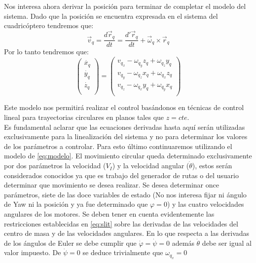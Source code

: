 \documentclass[main]{subfiles}
\begin{document}
Nos interesa ahora derivar la posici\'on para terminar de completar el modelo del sistema. Dado que la posici\'on se encuentra expresada en el sistema del cuadric\'optero tendremos que:
\begin{equation}
\vec{v}_q = \frac{d\vec{r}_q}{dt}=\frac{d\prime\vec{r}_q}{dt}+\vec{\omega}_q \times \vec{r}_q
\end{equation}
Por lo tanto tendremos que:
\begin{equation}
\label{eq:MVEcirc}
\left(\begin{array}{c}
\dot{x_q}\\
\dot{y_q}\\
\dot{z_q}\\
\end{array}\right)=\left(\begin{array}{c}
v_{q_x}-\omega_{q_y}z_q+\omega_{q_z}y_q\\
v_{q_y}-\omega_{q_z}x_q+\omega_{q_x}z_q\\
v_{q_z}-\omega_{q_x}y_q+\omega_{q_y}x_q\\
\end{array}\right)
\end{equation}

Este modelo nos permitir\'a realizar el control bas\'andonos en t\'ecnicas de control lineal para trayectorias circulares en planos tales que $z=cte$.\\

Es fundamental aclarar que las ecuaciones derivadas hasta aqu\'i ser\'an utilizadas exclusivamente para la linealizaci\'on del sistema y no para determinar los valores de los par\'ametros a controlar. Para esto \'ultimo continuaremos utilizando el modelo de \ref{eq:modelo}. El movimiento circular queda determinado exclusivamente por dos par\'ametros la velocidad ($V_I$) y la velocidad angular ($\dot{\theta}$), estos ser\'an considerados conocidos ya que es trabajo del generador de rutas o del usuario determinar que movimiento se desea realizar. Se desea determinar once par\'ametros, siete de las doce variables de estado (No nos interesa fijar ni \'angulo de Yaw ni la posici\'on y ya fue determinado que $\varphi = 0$) y las cuatro velocidades angulares de los motores.  Se deben tener en cuenta evidentemente las restricciones establecidas en \ref{eq:slit} sobre las derivadas de las velocidades del centro de masa y de las velocidades angulares. En lo que respecta a las derivadas de los \'angulos de Euler se debe cumplir que $\dot{\varphi}=\dot{\psi}=0$ adem\'as $\dot{\theta}$ debe ser igual al valor impuesto. De $\dot{\psi} = 0$ se deduce trivialmente que $\omega_{q_x} = 0$ 
\end{document}
